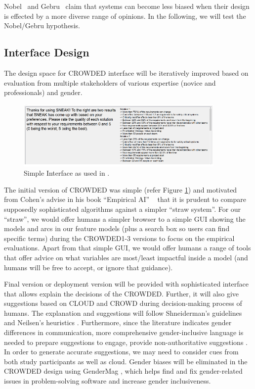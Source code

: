  

Nobel~\cite{noble2018algorithms} and Gebru~\cite{gebru21} claim that systems can become
less biased when their design is effected by a more diverse range of opinions.
In the following, we will test the Nobel/Gebru hypothesis.


\subsection{Interface Design}
The design space for CROWDED interface will be iteratively improved based on evaluation from multiple stakeholders of various expertise (novice and professionals) and gender.

\begin{figure}
  \includegraphics[width=4in]{fig/SNEAK-Interface.png}
\caption{Simple Interface as used in \cite{lustosa21}. 
} \label{sneak}
\end{figure} 

The initial version of CROWDED was simple (refer Figure \ref{sneak}) and motivated from Cohen's advise in  his book ``Empirical AI'' ~\cite{Cohen95} that it is prudent to compare supposedly sophisticated algorithms against a simpler ``straw system''. For our ``straw'', we would offer humans a simpler browser to a simple GUI showing the models and arcs in our feature models (plus a search box so users can find specific terms) during the CROWDED1-3 versions  to focus on the empirical evaluations. Apart from that simple GUI, we would  offer humans a range of tools that offer advice on what variables are most/least impactful inside a model (and humans will be free to accept, or ignore that guidance).

Final version or deployment version will be provided with sophisticated interface that allows explain the decisions of the CROWDED. Further, it will also give suggestions based on CLOUD and CROWD during decision-making process of humans. The explanation and suggestions  will follow Shneiderman's guidelines \cite{Shneiderman1982} and Neilsen's heuristics  \cite{Nielsen1990}. Furthermore, since the literature \cite{Kuttal2019, Lott2021} indicates gender differences in communication, more comprehensive gender-inclusive language  \cite{festante2007, miller2001handbook} is needed to prepare suggestions to engage, provide non-authoritative suggestions \cite{Seymour2017}. In order to generate accurate suggestions, we may need to consider cues from both study participants as well as cloud.  Gender biases will be eliminated in the CROWDED design using GenderMag \cite{Guizani, Chatterjee}, which helps find and fix gender-related issues in problem-solving software and increase gender inclusiveness. 


